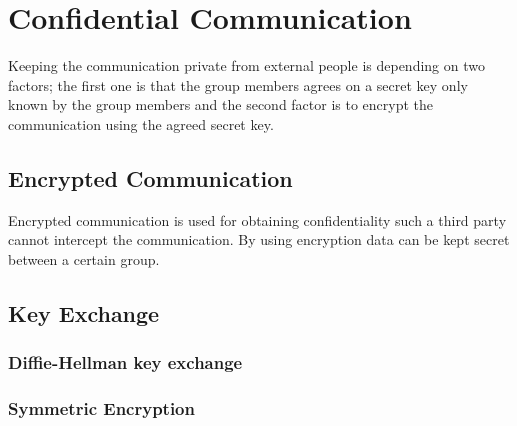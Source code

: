 \section{Confidential Communication}
Keeping the communication private from external people is depending on two factors; the first one is that the group members agrees on a secret key only known by the group members and the second factor is to encrypt the communication using the agreed secret key.
 
\subsection{Encrypted Communication}
Encrypted communication is used for obtaining confidentiality such a third party cannot intercept the communication. By using encryption data can be kept secret between a certain group.

\subsection{Key Exchange}
\subsubsection{Diffie-Hellman key exchange}
\subsubsection{Symmetric Encryption}





